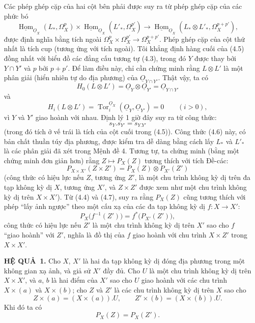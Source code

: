 \documentclass[11pt,twoside,openany]{book}
\numberwithin{equation}{section}
\newcommand{\src}[1]{%
  \phantomsection\hypertarget{src:\fgasourceid:#1}{}%
  \marginpar{\raggedleft\footnotesize\sffamily #1}%
}
\newcommand{\fgasourceid}{unset}
\newcommand{\Osh}{\underline{O}}
\newcommand{\Homsh}{\underline{\operatorname{Hom}}}
\newcommand{\result}[2]{\par\medskip\noindent\textbf{#1\if\relax\detokenize{#2}\relax\else\ #2\fi.}\quad}
\begin{document}
\src{180}
Các phép ghép cặp của hai cột bên phải được suy ra từ phép ghép cặp của
các phức bó
\[
\Homsh_{\Osh_X}(L_{*},\Omega_X^{p})
\times\Homsh_{\Osh_X}(L'_{*},\Omega_X^{p'})
\longrightarrow
\Homsh_{\Osh_X}(L_{*}\otimes L'_{*},\Omega_X^{p+p'}),
\]
được định nghĩa bằng tích ngoài
$\Omega_X^{p}\times\Omega_X^{p'}\longrightarrow\Omega_X^{p+p'}$.
Phép ghép cặp của cột thứ nhất là tích cup (tương ứng với tích
ngoài). Tôi khẳng định hàng cuối của (4.5) đồng nhất với biểu đồ
các đẳng cấu tương tự (4.3), trong đó $Y$ được thay bởi $Y\cap Y'$ và $p$ bởi
$p+p'$. Để làm điều này, chỉ cần chứng minh rằng $L\otimes L'$ là một phân giải
(hiển nhiên tự do địa phương) của $\Osh_{Y\cap Y'}$. Thật vậy, ta có
\[
  H_0(L\otimes L')=\Osh_Y\otimes\Osh_{Y'}=\Osh_{Y\cap Y'}
\]
và
\[
  H_i(L\otimes L')=\operatorname{Tor}_{i}^{\Osh_X}(\Osh_Y,\Osh_{Y'})=0
  \qquad(i>0),
\]
vì $Y$ và $Y'$ giao hoành với nhau. Định lý 1 giờ đây suy ra
từ công thức:
\begin{equation}\tag{4.6}
  s_Y.s_{Y'}=s_{Y.Y'}
\end{equation}
(trong đó tích ở vế trái là tích của cột cuối trong (4.5)).
Công thức (4.6) này, có bản chất thuần túy địa phương, được kiểm tra dễ dàng
bằng cách lấy $L_{*}$ và $L'_{*}$ là các phân giải đã xét trong Mệnh đề
4. Tương tự, ta chứng minh (bằng một chứng minh đơn giản hơn) rằng
$Z\longmapsto P_X(Z)$ tương thích với tích Đề-các:
\begin{equation}\tag{4.7}
  P_{X\times X'}(Z\times Z')=P_X(Z)\otimes P_{X'}(Z')
\end{equation}
(công thức có hiệu lực nếu $Z$, tương ứng $Z'$, là một chu trình không kỳ dị trên đa tạp
không kỳ dị $X$, tương ứng $X'$, và $Z\times Z'$ được xem như một chu trình không
kỳ dị trên $X\times X'$). Từ (4.4) và (4.7), suy ra rằng $P_X(Z)$ cũng
tương thích với phép “lấy ảnh ngược” theo một cấu xạ của các đa tạp không
kỳ dị $f:X\longrightarrow X'$:
\begin{equation}\tag{4.8}
  P_X\bigl(f^{-1}(Z')\bigr)=f^{*}\bigl(P_{X'}(Z')\bigr),
\end{equation}
công thức có hiệu lực nếu $Z'$ là một chu trình không kỳ dị trên $X'$ sao cho $f$
“giao hoành” với $Z'$, nghĩa là đồ thị của $f$ giao hoành với chu trình
$X\times Z'$ trong $X\times X'$.

\src{181}
\result{HỆ QUẢ}{1} Cho $X$, $X'$ là hai đa tạp không kỳ dị
đóng địa phương trong một không gian xạ ảnh, và giả sử $X'$ đầy đủ. Cho $U$
là một chu trình không kỳ dị trên $X\times X'$, và $a$, $b$ là hai điểm của $X'$ sao cho
$U$ giao hoành với các chu trình $X\times(a)$ và $X\times(b)$; cho $Z$
và $Z'$ là các chu trình không kỳ dị trên $X$ sao cho
\[
  Z\times(a)=(X\times(a)).U,
  \qquad
  Z'\times(b)=(X\times(b)).U.
\]
Khi đó ta có
\[
  P_X(Z)=P_X(Z').
\]
\end{document}
